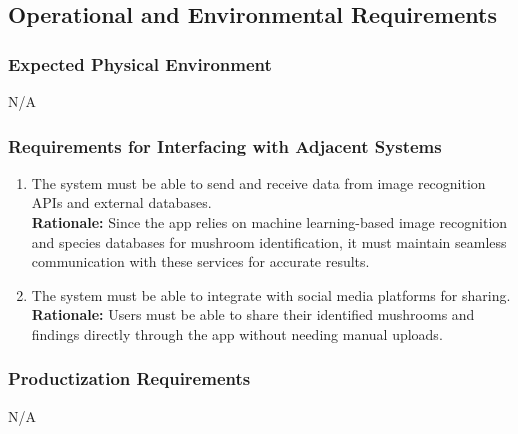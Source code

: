 \documentclass[]{article}
\begin{document}

\subsection{Operational and Environmental Requirements}
\label{sub:operational_and_environmental_requirements}

\subsubsection{Expected Physical Environment}
\label{ssub:expected_physical_environment}
\hspace{1.5cm}     N/A 

\subsubsection{Requirements for Interfacing with Adjacent Systems}
\label{ssub:requirements_for_interfacing_with_adjacent_systems}
\begin{enumerate}[{OE-IA}1. ]
	\item The system must be able to send and receive data from image recognition APIs and external databases.\\
	\textbf{Rationale:} Since the app relies on machine learning-based image recognition and species databases for mushroom identification, it must maintain seamless communication with these services for accurate results.
	\item The system must be able to integrate with social media platforms for sharing.\\
	\textbf{Rationale:}  Users must be able to share their identified mushrooms and findings directly through the app without needing manual uploads.
\end{enumerate}

\subsubsection{Productization Requirements}
\label{ssub:productization_requirements}
\hspace{1.5cm}     N/A 
\end{document}
